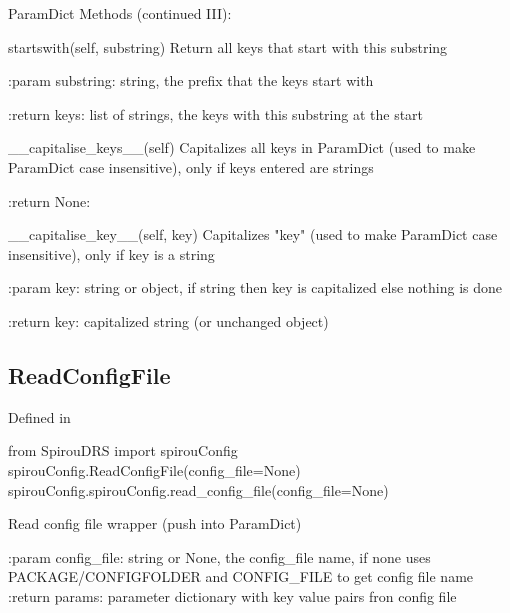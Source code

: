 \begin{minipage}{\textwidth}
\begin{pythondocstring}
ParamDict Methods (continued III):

	startswith(self, substring)
	        Return all keys that start with this substring

	        :param substring: string, the prefix that the keys start with

	        :return keys: list of strings, the keys with this substring at the start

	__capitalise_keys__(self)
	        Capitalizes all keys in ParamDict (used to make ParamDict case
	        insensitive), only if keys entered are strings

	        :return None:

	__capitalise_key__(self, key)
        Capitalizes "key" (used to make ParamDict case insensitive), only if
        key is a string

        :param key: string or object, if string then key is capitalized else
                    nothing is done

        :return key: capitalized string (or unchanged object)

\end{pythondocstring}
\end{minipage}

\begin{minipage}{\textwidth}
\subsection{ReadConfigFile}

Defined in \spirouConfig{}

\begin{pythonbox}
from SpirouDRS import spirouConfig
spirouConfig.ReadConfigFile(config_file=None)
spirouConfig.spirouConfig.read_config_file(config_file=None)
\end{pythonbox}

\begin{pythondocstring}
Read config file wrapper (push into ParamDict)

:param config_file: string or None, the config_file name, if none uses
                    PACKAGE/CONFIGFOLDER and CONFIG_FILE to get config
                    file name
:return params: parameter dictionary with key value pairs fron config file
\end{pythondocstring}
\end{minipage}

